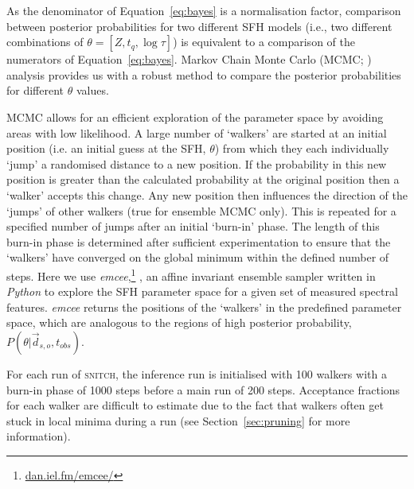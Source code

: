 \documentclass[useAMS,usenatbib]{mn2e}
\def\referee		{\color{refer}}
\begin{document}


{\referee As the denominator of Equation~\ref{eq:bayes} is a normalisation factor, comparison between posterior probabilities for two different SFH models (i.e., two different combinations of $\theta = [Z, t_q, \log \tau]$) is equivalent to a comparison of the numerators of Equation~\ref{eq:bayes}. Markov Chain Monte Carlo (MCMC; \citealt{mackay03, emcee13, GW10}) analysis provides us with a robust method to compare the posterior probabilities for different $\theta$ values.

MCMC allows for an efficient exploration of the parameter space by avoiding areas with low likelihood. A large number of `walkers' are started at an initial position (i.e. an initial guess at the SFH, $\theta$) from which they each individually `jump' a randomised distance to a new position. If the probability in this new position is greater than the calculated probability at the original position then a `walker' accepts this change. Any new position then influences the direction of the  `jumps' of other walkers (true for ensemble MCMC only). This is repeated for a specified number of jumps after an initial `burn-in' phase. The length of this burn-in phase is determined after sufficient experimentation to ensure that the `walkers' have converged on the global minimum within the defined number of steps. Here we use \emph{emcee},\footnote{\url{dan.iel.fm/emcee/}} \citep{emcee13}, an affine invariant ensemble sampler written in \emph{Python} to explore the SFH parameter space for a given set of measured spectral features. \emph{emcee} returns the positions of the `walkers' in the predefined parameter space, which are analogous to the regions of high posterior probability, $P(\theta|\vec{d}_{s,o}, t_{obs})$.

For each run of \textsc{snitch}, the inference run is initialised with 100 walkers with a burn-in phase of 1000 steps before a main run of 200 steps. Acceptance fractions for each walker are difficult to estimate due to the fact that walkers often get stuck in local minima during a run (see Section~\ref{sec:pruning} for more information). 

}
\end{document}
